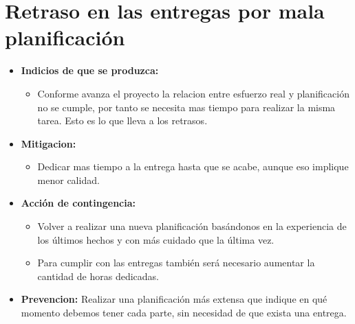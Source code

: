 \documentclass[spanish,a4paper,12pt]{report}	%
\begin{document}
	\section{Retraso en las entregas por mala planificación}
		\begin{itemize}
			\item \textbf {Indicios de que se produzca: }
				\begin{itemize}
				  \item Conforme avanza el proyecto la
						relacion entre esfuerzo real y planificación no se cumple, por tanto se necesita
						mas tiempo para realizar la misma tarea. Esto es lo que lleva a los retrasos.
				\end{itemize}
			\item \textbf {Mitigacion: }
				\begin{itemize}
				  \item Dedicar mas tiempo a la entrega hasta que se acabe,
					aunque eso implique menor calidad.
				\end{itemize}
			\item \textbf {Acción de contingencia: }
				\begin{itemize}
				  \item Volver a realizar una nueva
						planificación basándonos en la experiencia de los últimos hechos y con más
						cuidado que la última vez. 
				  \item Para cumplir con las entregas también será necesario
						aumentar la cantidad de horas dedicadas.
				\end{itemize}
			\item \textbf {Prevencion: }Realizar una planificación más extensa que indique
				en qué momento debemos tener cada parte, sin necesidad de que exista una
				entrega.
		
		\end{itemize}
	
\end{document}
